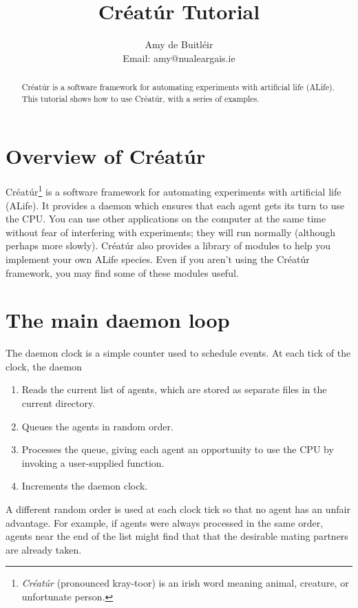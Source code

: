 \documentclass[a4paper,10pt]{article}
\title{Créatúr Tutorial}
\author{Amy de Buitl\'eir\\
        Email: amy@nualeargais.ie}
\begin{document}
\maketitle

\begin{abstract}
Créatúr is a software framework for automating experiments
with artificial life (ALife). 
This tutorial shows how to use Créatúr, with a series of examples.
\end{abstract}

\tableofcontents

\section{Overview of Créatúr}

Créatúr\footnote{\emph{Créatúr} (pronounced kray-toor) is an irish word 
meaning animal, creature, or unfortunate person.} 
is a software framework for automating experiments
with artificial life (ALife). 
It provides a daemon which ensures that each agent gets its turn 
to use the CPU. 
You can use other applications on the computer at the same time
without fear of interfering with experiments; they
will run normally (although perhaps more slowly).
Créatúr also provides a library of modules to help you implement your own 
ALife species.
Even if you aren't using the Créatúr framework, you may find some of these
modules useful.

\section{The main daemon loop}
\label{sec:daemon}

The daemon clock is a simple counter used to schedule events.
At each tick of the clock, the daemon

\begin{enumerate}
\item Reads the current list of agents, which are stored as separate files in
the current directory.
\item Queues the agents in random order.
\item Processes the queue, giving each agent an opportunity
to use the CPU by invoking a user-supplied function.
\item Increments the daemon clock.
\end {enumerate}

A different random order is used at each clock tick
so that no agent has an unfair advantage.
For example, if agents were always processed in the same order, 
agents near the end of the list might find that that the desirable mating
partners are already taken.
\end{document}
